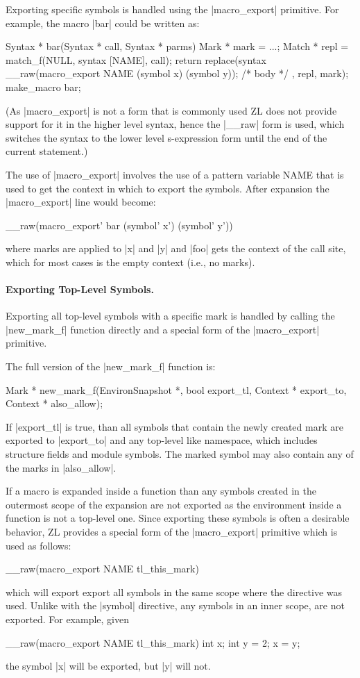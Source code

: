 Exporting specific symbols is handled using the |macro_export|
primitive.  For example, the macro |bar| could be written as:
\begin{code}
Syntax * bar(Syntax * call, Syntax * parms) {
   Mark * mark = ...;
   Match * repl = match_f(NULL, syntax [NAME], call);
   return replace(syntax {
     __raw(macro_export NAME (symbol x) (symbol y));
     /* body */
   }, repl, mark);
}
make_macro bar;
\end{code}
(As |macro_export| is not a form that is commonly used ZL does not
provide support for it in the higher level syntax, hence the |__raw|
form is used, which switches the syntax to the lower level
s-expression form until the end of the current statement.)

The use of |macro_export| involves the use of a pattern variable NAME
that is used to get the context in which to export the symbols.
After expansion the |macro_export| line would become:
\begin{code}
__raw(macro_export' bar (symbol' x') (symbol' y')) 
\end{code}
where marks are applied to |x| and |y| and |foo| gets the context of
the call site, which for most cases is the empty context (i.e., no
marks).

\paragraph{Exporting Top-Level Symbols.} 

Exporting all top-level symbols with a specific mark is handled by
calling the |new_mark_f| function directly and a special form of the
|macro_export| primitive.

The full version of the |new_mark_f| function is:
\begin{code}
Mark * new_mark_f(EnvironSnapshot *, bool export_tl, 
                  Context * export_to, Context * also_allow);
\end{code}
If |export_tl| is true, than all symbols that contain the newly
created mark are exported to |export_to| and any top-level like
namespace, which includes structure fields and module symbols.  The
marked symbol may also contain any of the marks in |also_allow|.

If a macro is expanded inside a function than any symbols created in
the outermost scope of the expansion are not exported as the environment
inside a function is not a top-level one.  Since exporting these
symbols is often a desirable behavior, ZL provides a special form of
the |macro_export| primitive which is used as follows:
\begin{code}
__raw(macro_export NAME tl_this_mark)
\end{code}
which will export export all symbols in the same scope where the
directive was used.  Unlike with the |symbol| directive, any symbols
in an inner scope, are not exported.  For example, given
\begin{code}
__raw(macro_export NAME tl_this_mark)
int x;
{
  int y = 2;
  x = y;
}
\end{code}
the symbol |x| will be exported, but |y| will not.

